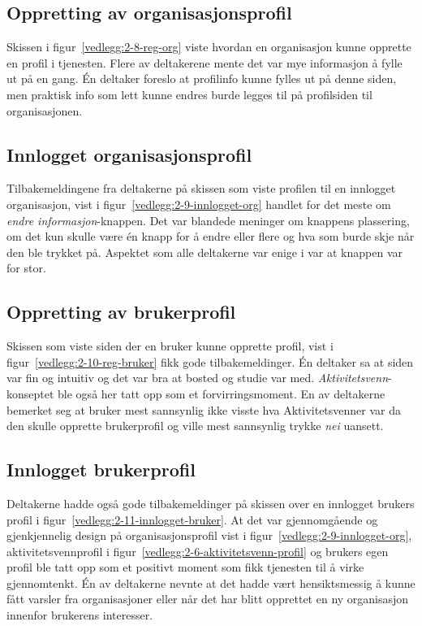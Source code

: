 \subsection{Oppretting av organisasjonsprofil}

Skissen i figur~\ref{vedlegg:2-8-reg-org} viste hvordan en organisasjon kunne opprette en profil i tjenesten. Flere av deltakerene mente det var mye informasjon å fylle ut på en gang. Én deltaker foreslo at profilinfo kunne fylles ut på denne siden, men praktisk info som lett kunne endres burde legges til på profilsiden til organisasjonen.


\subsection{Innlogget organisasjonsprofil}

Tilbakemeldingene fra deltakerne på skissen som viste profilen til en innlogget organisasjon, vist i figur~\ref{vedlegg:2-9-innlogget-org} handlet for det meste om {\em  endre informasjon}-knappen. Det var blandede meninger om knappens plassering, om det kun skulle være én knapp for å endre eller flere og hva som burde skje når den ble trykket på. Aspektet som alle deltakerne var enige i var at knappen var for stor.


\subsection{Oppretting av brukerprofil}

Skissen som viste siden der en bruker kunne opprette profil, vist i figur~\ref{vedlegg:2-10-reg-bruker} fikk gode tilbakemeldinger. Én deltaker sa at siden var fin og intuitiv og det var bra at bosted og studie var med. {\em  Aktivitetsvenn}-konseptet ble også her tatt opp som et forvirringsmoment. En av deltakerne bemerket seg at bruker mest sannsynlig ikke visste hva Aktivitetsvenner var da den skulle opprette brukerprofil og ville mest sannsynlig trykke {\em  nei} uansett.


\subsection{Innlogget brukerprofil}

Deltakerne hadde også gode tilbakemeldinger på skissen over en innlogget brukers profil i figur~\ref{vedlegg:2-11-innlogget-bruker}. At det var gjennomgående og gjenkjennelig design på organisasjonsprofil vist i figur~\ref{vedlegg:2-9-innlogget-org}, aktivitetsvennprofil i figur~\ref{vedlegg:2-6-aktivitetsvenn-profil} og brukers egen profil ble tatt opp som et positivt moment som fikk tjenesten til å virke gjennomtenkt. Én av deltakerne nevnte at det hadde vært hensiktsmessig å kunne fått varsler fra organisasjoner eller når det har blitt opprettet en ny organisasjon innenfor brukerens interesser.


